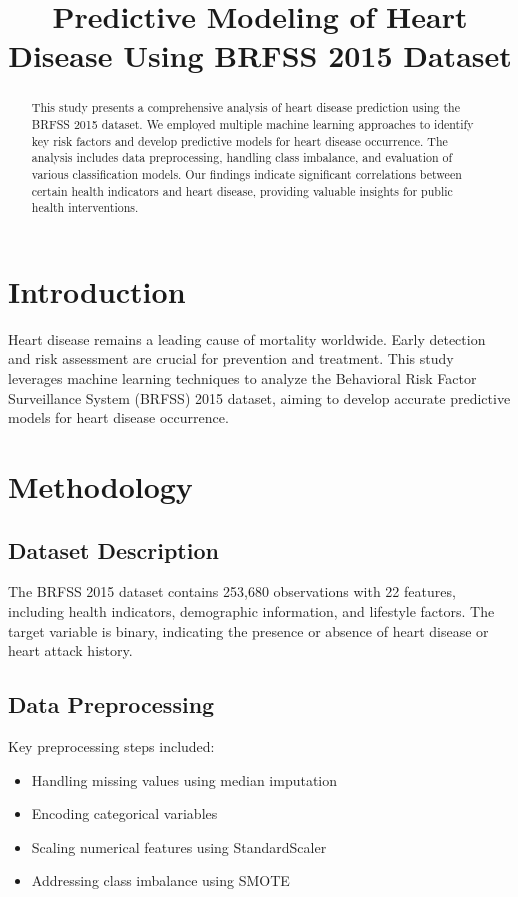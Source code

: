 \documentclass[conference]{IEEEtran}
\begin{document}
\title{Predictive Modeling of Heart Disease Using BRFSS 2015 Dataset}

\maketitle

\begin{abstract}
This study presents a comprehensive analysis of heart disease prediction using the BRFSS 2015 dataset. We employed multiple machine learning approaches to identify key risk factors and develop predictive models for heart disease occurrence. The analysis includes data preprocessing, handling class imbalance, and evaluation of various classification models. Our findings indicate significant correlations between certain health indicators and heart disease, providing valuable insights for public health interventions.
\end{abstract}

\section{Introduction}
Heart disease remains a leading cause of mortality worldwide. Early detection and risk assessment are crucial for prevention and treatment. This study leverages machine learning techniques to analyze the Behavioral Risk Factor Surveillance System (BRFSS) 2015 dataset, aiming to develop accurate predictive models for heart disease occurrence.

\section{Methodology}
\subsection{Dataset Description}
The BRFSS 2015 dataset contains 253,680 observations with 22 features, including health indicators, demographic information, and lifestyle factors. The target variable is binary, indicating the presence or absence of heart disease or heart attack history.

\subsection{Data Preprocessing}
Key preprocessing steps included:
\begin{itemize}
    \item Handling missing values using median imputation
    \item Encoding categorical variables
    \item Scaling numerical features using StandardScaler
    \item Addressing class imbalance using SMOTE
\end{itemize}
\end{document}
